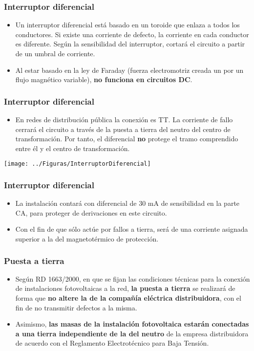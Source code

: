\documentclass[serif, xcolor=dvipsnames]{beamer}
\begin{document}
\begin{frame}
\frametitle{Interruptor diferencial}
\begin{itemize}
\item Un interruptor diferencial está basado en un toroide que enlaza a
todos los conductores. Si existe una corriente de defecto, la corriente
en cada conductor es diferente. Según la sensibilidad del interruptor,
cortará el circuito a partir de un umbral de corriente.
\item Al estar basado en la ley de Faraday (fuerza electromotriz creada
un por un flujo magnético variable), \textbf{no funciona en circuitos
DC}.
\end{itemize}

\end{frame}

\begin{frame}
\frametitle{Interruptor diferencial}
\begin{itemize}
\item En redes de distribución pública la conexión es TT. La corriente de
fallo cerrará el circuito a través de la puesta a tierra del neutro
del centro de transformación. Por tanto, el diferencial \textbf{no}
protege el tramo comprendido entre él y el centro de transformación.
\end{itemize}
\begin{center}
\texttt{[image: ../Figuras/InterruptorDiferencial]}
\par\end{center}


\end{frame}

\begin{frame}
\frametitle{Interruptor diferencial}
\begin{block}
{}
\begin{itemize}
\item La instalación contará con diferencial de 30 mA de sensibilidad en
la parte CA, para proteger de derivaciones en este circuito. 
\item Con el fin de que sólo actúe por fallos a tierra, será de una corriente
asignada superior a la del magnetotérmico de protección. 
\end{itemize}
\end{block}

\end{frame}

\begin{frame}
\frametitle{Puesta a tierra}
\begin{itemize}
\item Según RD 1663/2000, en que se fijan las condiciones técnicas para
la conexión de instalaciones fotovoltaicas a la red, \textbf{la puesta
a tierra} se realizará de forma que \textbf{no altere la de la compañía
eléctrica distribuidora}, con el fin de no transmitir defectos a la
misma.
\item Asimismo, \textbf{las masas de la instalación fotovoltaica estarán
conectadas a una tierra independiente de la del neutro} de la empresa
distribuidora de acuerdo con el Reglamento Electrotécnico para Baja
Tensión.
\end{itemize}

\end{frame}
\end{document}
